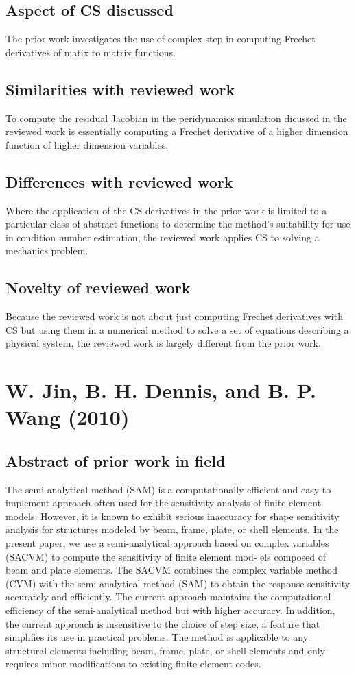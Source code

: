 \documentclass[10pt,letterpaper,draft]{article}
\begin{document}
\subsection{Aspect of CS discussed}
The prior work investigates the use of complex step in computing Frechet derivatives 
of matix to matrix functions.

\subsection{Similarities with reviewed work}
To compute the residual Jacobian in the peridynamics simulation dicussed in the reviewed
work is essentially computing a Frechet derivative of a higher dimension function of higher
dimension variables.

\subsection{Differences with reviewed work}
Where the application of the CS derivatives in the prior work is limited to a particular 
class of abstract functions to determine the method's suitability for use in condition number
estimation, the reviewed work applies CS to solving a mechanics problem.

\subsection{Novelty of reviewed work}
Because the reviewed work is not about just computing Frechet derivatives with CS but using
them in a numerical method to solve a set of equations describing a physical system, the reviewed
work is largely different from the prior work.

\section{W. Jin, B. H. Dennis, and B. P. Wang (2010)}
\subsection{Abstract of prior work in field}

The semi-analytical method (SAM) is a computationally efficient and easy to
implement approach often used for the sensitivity analysis of finite element
models.  However, it is known to exhibit serious inaccuracy for shape
sensitivity analysis for structures modeled by beam, frame, plate, or shell
elements. In the present paper, we use a semi-analytical approach based on
complex variables (SACVM) to compute the sensitivity of finite element mod- els
composed of beam and plate elements. The SACVM combines the complex variable
method (CVM) with the semi-analytical method (SAM) to obtain the response
sensitivity accurately and efficiently. The current approach maintains the
computational efficiency of the semi-analytical method but with higher
accuracy. In addition, the current approach is insensitive to the choice of
step size, a feature that simplifies its use in practical problems. The method
is applicable to any structural elements including beam, frame, plate, or shell
elements and only requires minor modifications to existing finite element
codes.
\end{document}
